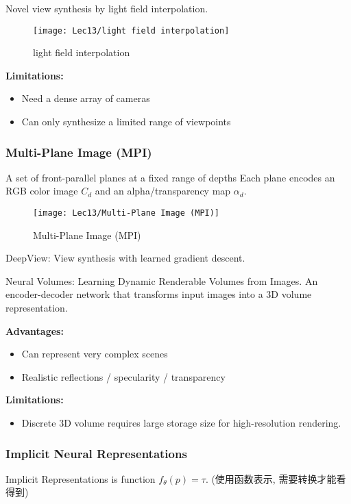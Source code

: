 Novel view synthesis by light field interpolation. 

\begin{figure}[H]
    \centering
    \texttt{[image: Lec13/light field interpolation]}
    \caption{light field interpolation}
\end{figure}

\textbf{Limitations: }
\begin{itemize}
    \item Need a dense array of cameras
    \item Can only synthesize a limited range of viewpoints
\end{itemize}

\subsubsection{Multi-Plane Image (MPI)}
A set of front-parallel planes at a fixed range of depths
Each plane encodes an RGB color image $C_d$ and an alpha/transparency map $\alpha_d$. 

\begin{figure}[H]
    \centering
    \texttt{[image: Lec13/Multi-Plane Image (MPI)]}
    \caption{Multi-Plane Image (MPI)}
\end{figure}

DeepView: View synthesis with learned gradient descent.

Neural Volumes: Learning Dynamic Renderable Volumes from Images. An encoder-decoder network that transforms
input images into a 3D volume representation. 

\textbf{Advantages: }
\begin{itemize}
    \item Can represent very complex scenes
    \item Realistic reflections / specularity / transparency
\end{itemize}

\textbf{Limitations: }
\begin{itemize}
    \item Discrete 3D volume requires large storage size for high-resolution rendering. 
\end{itemize}

\subsubsection{Implicit Neural Representations}
Implicit Representations is function $f_{\theta}(p)=\tau $. (使用函数表示, 需要转换才能看得到) 

